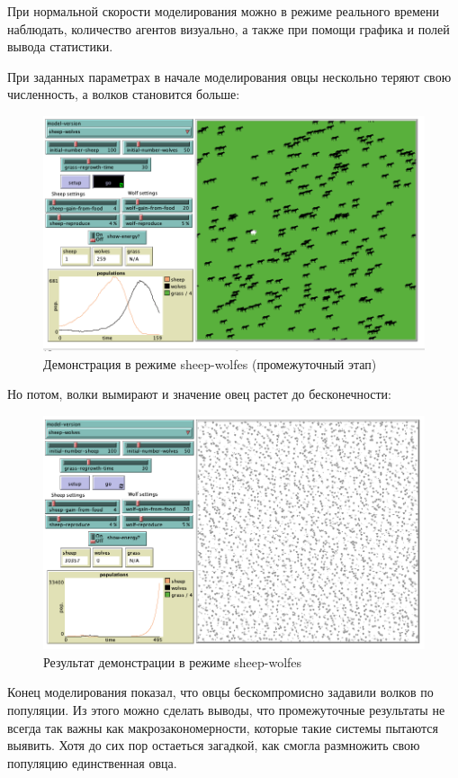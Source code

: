 \documentclass[14pt,a4paper,report]{report}
\begin{document}
При нормальной скорости моделирования можно в режиме реального времени наблюдать, количество агентов визуально, а также при помощи графика и полей вывода статистики. 

При заданных параметрах в начале моделирования овцы нескольно теряют свою численность, а волков становится больше:

\begin{figure}[h!]
	\centering
	\includegraphics[scale = 0.68]{images/4_2.png}
	\caption{Демонстрация в режиме sheep-wolfes (промежуточный этап)}
\end{figure}
\clearpage
Но потом, волки вымирают и значение овец растет до бесконечности:



\begin{figure}[h!]
	\centering
	\includegraphics[scale = 0.68]{images/5.png}
	\caption{Результат демонстрации в режиме sheep-wolfes}
\end{figure}

Конец моделирования показал, что овцы бескомпромисно задавили волков по популяции. Из этого можно сделать выводы, что промежуточные результаты не всегда так важны как макрозакономерности, которые такие системы пытаются выявить. Хотя до сих пор остаеться загадкой, как смогла размножить свою популяцию единственная овца.
\clearpage
\end{document}
